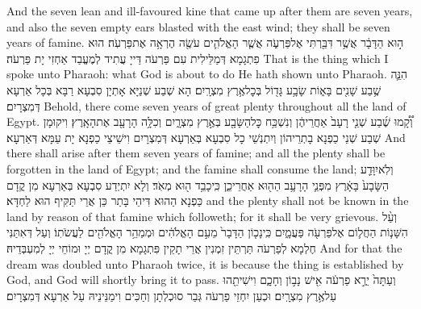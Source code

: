 {And the seven lean and ill-favoured kine that came up after them are seven years, and also the seven empty ears blasted with the east wind; they shall be seven years of famine.}{}
{ה֣וּא הַדָּבָ֔ר אֲשֶׁ֥ר דִּבַּ֖רְתִּי אֶל\maqqaf פַּרְעֹ֑ה אֲשֶׁ֧ר הָאֱלֹהִ֛ים עֹשֶׂ֖ה הֶרְאָ֥ה אֶת\maqqaf פַּרְעֹֽה׃}
{הוּא פִתְגָמָא דְּמַלֵּילִית עִם פַּרְעֹה דַּייָ עֲתִיד לְמֶעֱבַד אַחְזִי יָת פַּרְעֹה׃}
{That is the thing which I spoke unto Pharaoh: what God is about to do He hath shown unto Pharaoh.}{}
{הִנֵּ֛ה שֶׁ֥בַע שָׁנִ֖ים בָּא֑וֹת שָׂבָ֥ע גָּד֖וֹל בְּכׇל\maqqaf אֶ֥רֶץ מִצְרָֽיִם׃}
{הָא שְׁבַע שְׁנַיָּא אָתְיָן סִבְעָא רַבָּא בְּכָל אַרְעָא דְּמִצְרָיִם׃}
{Behold, there come seven years of great plenty throughout all the land of Egypt.}{}
{וְ֠קָ֠מוּ שֶׁ֜בַע שְׁנֵ֤י רָעָב֙ אַחֲרֵיהֶ֔ן וְנִשְׁכַּ֥ח כׇּל\maqqaf הַשָּׂבָ֖ע בְּאֶ֣רֶץ מִצְרָ֑יִם וְכִלָּ֥ה הָרָעָ֖ב אֶת\maqqaf הָאָֽרֶץ׃}
{וִיקוּמָן שְׁבַע שְׁנֵי כַפְנָא בָתְרֵיהוֹן וְיִתְנְשֵׁי כָל סִבְעָא בְּאַרְעָא דְּמִצְרָיִם וִישֵׁיצֵי כַפְנָא יָת עַמָּא דְּאַרְעָא׃}
{And there shall arise after them seven years of famine; and all the plenty shall be forgotten in the land of Egypt; and the famine shall consume the land;}{}
{וְלֹֽא\maqqaf יִוָּדַ֤ע הַשָּׂבָע֙ בָּאָ֔רֶץ מִפְּנֵ֛י הָרָעָ֥ב הַה֖וּא אַחֲרֵי\maqqaf כֵ֑ן כִּֽי\maqqaf כָבֵ֥ד ה֖וּא מְאֹֽד׃}
{וְלָא יִתְיְדַע סִבְעָא בְּאַרְעָא מִן קֳדָם כַּפְנָא הַהוּא דִּיהֵי בָּתַר כֵּן אֲרֵי תַּקִּיף הוּא לַחְדָּא׃}
{and the plenty shall not be known in the land by reason of that famine which followeth; for it shall be very grievous.}{}
{וְעַ֨ל הִשָּׁנ֧וֹת הַחֲל֛וֹם אֶל\maqqaf פַּרְעֹ֖ה פַּעֲמָ֑יִם כִּֽי\maqqaf נָכ֤וֹן הַדָּבָר֙ מֵעִ֣ם הָאֱלֹהִ֔ים וּמְמַהֵ֥ר הָאֱלֹהִ֖ים לַעֲשֹׂתֽוֹ׃}
{וְעַל דְּאִתַּנִּי חֶלְמָא לְפַרְעֹה תַּרְתֵּין זִמְנִין אֲרֵי תָקֵין פִּתְגָמָא מִן קֳדָם יְיָ וּמוֹחֵי יְיָ לְמִעְבְּדֵיהּ׃}
{And for that the dream was doubled unto Pharaoh twice, it is because the thing is established by God, and God will shortly bring it to pass.}{}
{וְעַתָּה֙ יֵרֶ֣א פַרְעֹ֔ה אִ֖ישׁ נָב֣וֹן וְחָכָ֑ם וִישִׁיתֵ֖הוּ עַל\maqqaf אֶ֥רֶץ מִצְרָֽיִם׃}
{וּכְעַן יִחְזֵי פַרְעֹה גְּבַר סוּכְלְתָן וְחַכִּים וִימַנֵּינֵיהּ עַל אַרְעָא דְּמִצְרָיִם׃}
